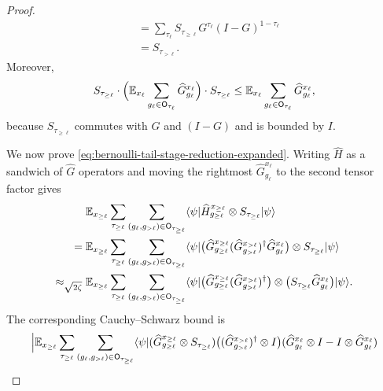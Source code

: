 \begin{proof}
\begin{align}
		 & =
		\sum_{\tau_\ell}
		S_{\tau_{\ge \ell}} G^{\tau_\ell}(I-G)^{1-\tau_\ell}\nonumber \\
		 & =
		S_{\tau_{>\ell}}.
		\label{eq:S-recurrence}
	\end{align}
	Moreover,
	\begin{align}
		S_{\tau_{\ge \ell}}
		\cdot
		\Bigl(\mathbb{E}_{x_\ell} \sum_{g_\ell \in \mathsf O_{\tau_\ell}} \widehat G_{g_\ell}^{x_\ell}\Bigr)
		\cdot
		S_{\tau_{\ge \ell}}
		\le
		\mathbb{E}_{x_\ell} \sum_{g_\ell \in \mathsf O_{\tau_\ell}} \widehat G_{g_\ell}^{x_\ell},
		\label{eq:S-sandwich}
	\end{align}
	because $S_{\tau_{\ge \ell}}$ commutes with $G$ and $(I-G)$ and is bounded by $I$.

	We now prove \ref{eq:bernoulli-tail-stage-reduction-expanded}. Writing $\widehat H$ as a sandwich of $\widehat G$ operators and moving the rightmost $\widehat G_{g_\ell}^{x_\ell}$ to the second tensor factor gives
	\begin{align}
		                          & \mathbb{E}_{x_{\ge \ell}} \sum_{\tau_{\ge \ell}} \sum_{(g_\ell,g_{>\ell})\in \mathsf O_{\tau_{\ge \ell}}}
		\langle \psi \rvert \widehat H_{g_{\ge \ell}}^{x_{\ge \ell}} \otimes S_{\tau_{\ge \ell}}\lvert \psi \rangle\nonumber                                \\
		={}                       &
		\mathbb{E}_{x_{\ge \ell}} \sum_{\tau_{\ge \ell}} \sum_{(g_\ell,g_{>\ell})\in \mathsf O_{\tau_{\ge \ell}}}
		\langle \psi \rvert
		\bigl(\widehat G_{g_{\ge \ell}}^{x_{\ge \ell}}
		(\widehat G_{g_{>\ell}}^{x_{>\ell}})^\dagger \widehat G_{g_\ell}^{x_\ell}\bigr)
		\otimes S_{\tau_{\ge \ell}}\lvert \psi \rangle\nonumber                                                                                    \\
		\approx_{\sqrt{2\zeta}}{} &
		\mathbb{E}_{x_{\ge \ell}} \sum_{\tau_{\ge \ell}} \sum_{(g_\ell,g_{>\ell})\in \mathsf O_{\tau_{\ge \ell}}}
		\langle \psi \rvert
		\bigl(\widehat G_{g_{\ge \ell}}^{x_{\ge \ell}}
		(\widehat G_{g_{>\ell}}^{x_{>\ell}})^\dagger\bigr)
		\otimes \bigl(S_{\tau_{\ge \ell}}\widehat G_{g_\ell}^{x_\ell}\bigr)\lvert \psi \rangle.
		\label{eq:move-rightmost-g-to-second-factor}
	\end{align}
	The corresponding Cauchy--Schwarz bound is
	\begin{multline}\label{eq:first-cauchy-schwarz-bound}
		\Bigl|
		\E_{x_{\ge \ell}} \sum_{\tau_{\ge \ell}} \sum_{(g_\ell,g_{>\ell})\in \mathsf O_{\tau_{\ge \ell}}}
		\bra{\psi}
		(\widehat G_{g_{\ge \ell}}^{x_{\ge \ell}} \ot S_{\tau_{\ge \ell}})
		\bigl((\widehat G_{g_{>\ell}}^{x_{>\ell}})^\dagger \ot I\bigr)
		(\widehat G_{g_\ell}^{x_\ell}\ot I - I \ot \widehat G_{g_\ell}^{x_\ell})

\end{multline}
\end{proof}
